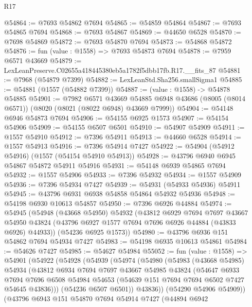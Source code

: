 \begin{lexlean}{R17}
\begin{coremodule}
@54864 := @7693 @54862 @7694
@54865 := @54859 @54864
@54867 := @7693 @54865 @7694
@54868 := @7693 @54867
@54869 := @44650 @6528
@54870 := @7698 @54869
@54872 := @7693 @54870 @7694
@54873 := @54868 @54872
@54876 := fun (value : @1558) => @7693 @54873 @7694
@54878 := @7959 @6571 @43669
@54879 := LexLeanPreserve.C02655a418445380eb5a1782f5dbb17fb.R17.__fits_87
@54881 := @7968 (@54879 @7399)
@54882 := LexLeanStd.Sha256.smallSigma1
@54885 := @54881 (@1557 (@54882 @7399))
@54887 := (value : @1558) -> @54878 @54885
@54901 := @7982
    @6571
    @43669
    @54885
    @6948
    @43686
    (@8005 (@8014 @6571))
    (@8020 (@8021 (@8022 @6948) @43669 @7999))
@54904 := @54148 @6946 @54873 @7694
@54906 := @54155 @6925 @1573
@54907 := @54154 @54906
@54909 := @54155 @6507 @6501
@54910 := @54907 @54909
@54911 := @1557 @54910
@54912 := @7396 @54911
@54913 := @44660 @6528
@54914 := @1557 @54913
@54916 := @7396 @54914 @7427
@54922 := @54904 (@54912 @54916) (@1557 (@54154 @54910 @54913))
@54928 := @43796 @6940 @6945 @54867 @54872 @54911 @54916
@54931 := @54148 @6939 @54865 @7694
@54932 := @1557 @54906
@54933 := @7396 @54932
@54934 := @1557 @54909
@54936 := @7396 @54934 @7427
@54939 := @54931 (@54933 @54936) @54911
@54945 := @43796 @6931 @6938 @54858 @54864 @54932 @54936
@54948 := @54198 @6930 @10613 @54857
@54950 := @7396 @6926 @44884
@54974 := @54945
    (@54948
      (@43668 @54950)
      @54932
      (@43812
        @6929
        @7694
        @7697
        @43667
        @54950
        @43824
        (@43796 @6927 @1577 @7694 @7696 @6926 @44884 (@43833 @6926) @44933))
      (@54236 @6925 @1573))
@54980 := @43796 @6936 @151 @54862 @7694 @54934 @7427
@54983 := @54198 @6935 @10613 @54861
@54984 := @54626 @7427
@54985 := @54627 @54984
@55052 := fun (value : @1558) =>
  @54901
    (@54922
      (@54928
        (@54939
          (@54974
            (@54980
              (@54983
                (@43668 @54985)
                @54934
                (@43812
                  @6934
                  @7694
                  @7697
                  @43667
                  @54985
                  @43824
                  (@54647
                    @6933
                    @7694
                    @7696
                    @6508
                    @54984
                    @54653
                    (@54639 @151 @7694 @7694 @6502 @7427 @54645 @43836)))
                (@54236 @6507 @6501))
              @43836))
          (@54290 @54906 @54909))
        (@43796
          @6943
          @151
          @54870
          @7694
          @54914
          @7427
          (@44894
            @6942

\end{coremodule}
\end{lexlean}
